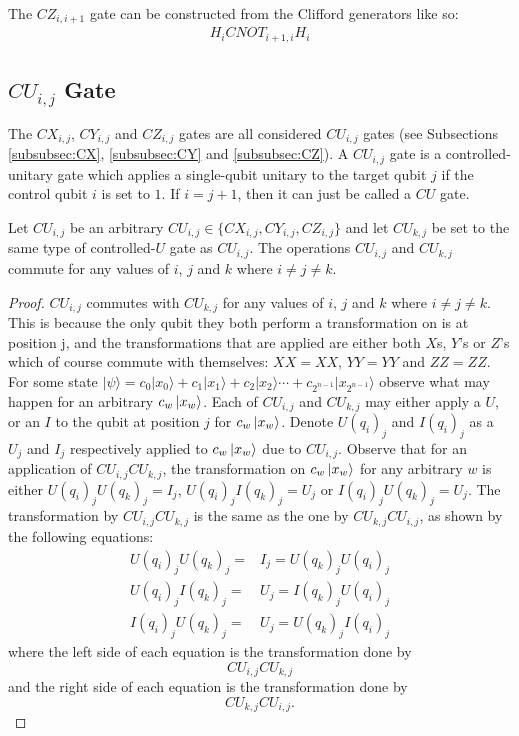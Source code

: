 The $\mathit{CZ}_{i,i+1}$ gate can be constructed from the Clifford generators like so:
\begin{align}
H_{i}\mathit{CNOT}_{i+1,i}H_{i}
\end{align}

\subsection{\texorpdfstring{$\mathit{CU}_{i,j}$}{ i,j} Gate}
\label{subsubsec:CU}
The $\mathit{CX}_{i,j}$, $\mathit{CY}_{i,j}$ and $\mathit{CZ}_{i,j}$ gates are all considered $\mathit{CU}_{i,j}$ gates (see Subsections \ref{subsubsec:CX}, \ref{subsubsec:CY} and \ref{subsubsec:CZ}). A $\mathit{CU}_{i,j}$ gate is a controlled-unitary gate which applies a single-qubit unitary to the target qubit $j$ if the control qubit $i$ is set to $1$. If $i = j + 1$, then it can just be called a $\mathit{CU}$ gate.

\begin{theorem}
\label{theorem:CUsCommute}
Let $\mathit{CU}_{i,j}$ be an arbitrary $\mathit{CU}_{i,j} \in \{\mathit{CX}_{i,j}, \mathit{CY}_{i,j}, \mathit{CZ}_{i,j}\}$ and let $\mathit{CU}_{k,j}$ be set to the same type of controlled-$U$ gate as $\mathit{CU}_{i,j}$. The operations $\mathit{CU}_{i,j}$ and $\mathit{CU}_{k,j}$ commute for any values of $i$, $j$ and $k$ where $i \neq j \neq k$.
\end{theorem}
\begin{proof}
$\mathit{CU}_{i,j}$ commutes with $\mathit{CU}_{k,j}$ for any values of $i$, $j$ and $k$ where $i \neq j \neq k$. This is because the only qubit they both perform a transformation on is at position j, and the transformations that are applied are either both $X$s, $Y$'s or $Z$'s which of course commute with themselves: $XX = XX$, $YY = YY$ and $ZZ = ZZ$. For some state $|\psi\rangle = c_0|x_0\rangle + c_1|x_1\rangle + c_2|x_2\rangle \cdots + c_{2^{n-1}}|x_{2^{n-1}}\rangle$ observe what may happen for an arbitrary $c_w\ket{x_w}$. Each of $\mathit{CU}_{i,j}$ and $\mathit{CU}_{k,j}$ may either apply a $U$, or an $I$ to the qubit at position $j$ for $c_w\ket{x_w}$. Denote $U(q_i)_j$ and $I(q_i)_j$ as a $U_j$ and $I_j$ respectively applied to $c_w\ket{x_w}$ due to $\mathit{CU}_{i,j}$. Observe that for an application of $\mathit{CU}_{i,j}\mathit{CU}_{k,j}$, the transformation on $c_w\ket{x_w}$ for any arbitrary $w$ is either $U(q_i)_j U(q_k)_j = I_j$, $U(q_i)_jI(q_k)_j = U_j$ or $I(q_i)_jU(q_k)_j = U_j$. The transformation by $\mathit{CU}_{i,j}\mathit{CU}_{k,j}$ is the same as the one by $\mathit{CU}_{k,j}\mathit{CU}_{i,j}$, as shown by the following equations:
\begin{align}
U(q_i)_j U(q_k)_j = &I_j = U(q_k)_j U(q_i)_j\\
U(q_i)_jI(q_k)_j = &U_j = I(q_k)_jU(q_i)_j\\
I(q_i)_jU(q_k)_j = &U_j = U(q_k)_jI(q_i)_j
\end{align}
where the left side of each equation is the transformation done by $$\mathit{CU}_{i,j}\mathit{CU}_{k,j}$$ and the right side of each equation is the transformation done by $$\mathit{CU}_{k,j}\mathit{CU}_{i,j}.$$
\end{proof}

